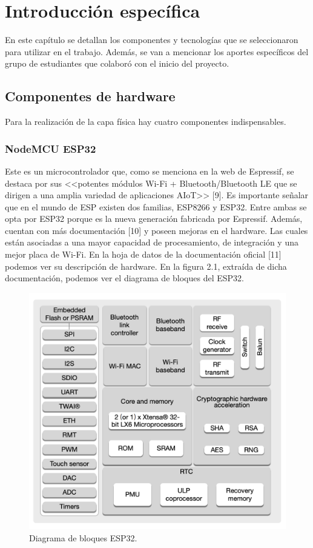 \chapter{Introducción específica} %

En este capítulo se detallan los componentes y tecnologías que se seleccionaron para utilizar en el trabajo. Además, se van a mencionar los aportes específicos del grupo de estudiantes que colaboró con el inicio del proyecto.

\section{Componentes de hardware}
Para la realización de la capa física hay cuatro componentes indispensables.

\subsection{NodeMCU ESP32}
Este es un microcontrolador que, como se menciona en la web de Espressif, se destaca por sus <<potentes módulos Wi-Fi + Bluetooth/Bluetooth LE que se dirigen a una amplia variedad de aplicaciones AIoT>> [9]. Es importante señalar que en el mundo de ESP existen dos familias, ESP8266 y ESP32. Entre ambas se opta por ESP32 porque es la nueva generación fabricada por Espressif. Además, cuentan con más documentación [10] y poseen mejoras en el hardware. Las cuales están asociadas a una mayor capacidad de procesamiento, de integración y una mejor placa de Wi-Fi. En la hoja de datos de la documentación oficial [11] podemos ver su descripción de hardware. En la figura 2.1, extraída de dicha documentación, podemos ver el diagrama de bloques del ESP32.

\begin{figure}[htpb]
\centering 
\includegraphics[width=.6\textwidth]{./Figures/esp32hardware.png}
\caption{Diagrama de bloques ESP32.}
\label{fig:diagBloques}
\end{figure}

